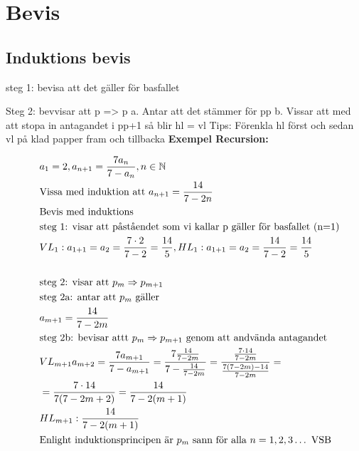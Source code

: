 \documentclass{article}
\begin{document}
\newpage

\section{Bevis}
\subsection{Induktions bevis}
steg 1: bevisa att det gäller för basfallet

Steg 2: bevvisar att p => p
a. Antar att det stämmer för pp
b. Vissar att med att stopa in antagandet i pp+1 så blir hl = vl
Tips: Förenkla hl först och sedan vl på klad papper fram och tillbacka
\textbf{Exempel Recursion:}\par
\begin{align*}
  &\quad  a_1 = 2, a_{n+1} = \frac{7a_n}{7-a_n}, n \in \mathbb{N} \\
  &\quad  \text{Vissa med induktion att } a_{n+1} = \frac{14}{7-2n} \\ 
  &\quad  \text{Bevis med induktions} \\
  &\quad  \text{steg 1: visar att påståendet som vi kallar p gäller för basfallet (n=1)} \\
  &\quad  VL_1: a_{1+1}=a_2=\frac{7 \cdot 2}{7-2}=\frac{14}{5}, HL_1: a_{1+1}=a_2=\frac{14}{7-2}=\frac{14}{5} \\
  &\quad  \\
  &\quad  \text{steg 2: visar att } p_m \Rightarrow p_{m+1} \\
  &\quad  \text{steg 2a: antar att } p_m \text{ gäller} \\
  &\quad  a_{m+1}=\frac{14}{7-2m}\\
  &\quad  \text{steg 2b: bevisar attt } p_m \Rightarrow p_{m+1} \text{ genom att andvända antagandet} \\
  &\quad  VL_{m+1}a_{m+2}=\frac{7a_{m+1}}{7-a_{m+1}} = \frac{7 \frac{14}{7-2m}}{7-\frac{14}{7-2m}} = \frac{\frac{7 \cdot14}{7-2m}}{\frac{7(7-2m) - 14}{7-2m}} = \\
  &\quad  = \frac{7 \cdot 14}{7(7-2m+2)} = \frac{14}{7-2(m+1)} \\
  &\quad  HL_{m+1}: \frac{14}{7-2(m+1)} \\
  &\quad  \text{Enlight induktionsprincipen är $ p_m $ sann för alla } n = 1,2,3 \ldots \text{ VSB}  \\
\end{align*}
\end{document}

